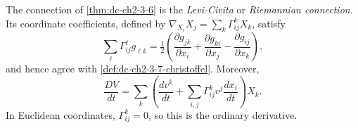 \begin{remark}
  \label{rem:dc-ch2-3-7}
  The connection of \cref{thm:dc-ch2-3-6} is the \emph{Levi-Civita} or
  \emph{Riemannian connection}. Its coordinate coefficients, defined by
  $\nabla_{X_i}X_j=\sum_k\Gamma_{ij}^kX_k$, satisfy
  \[
    \sum_\ell\Gamma_{ij}^\ell g_{\ell k}
      =\tfrac12\left(
        \frac{\partial g_{jk}}{\partial x_i}
       +\frac{\partial g_{ki}}{\partial x_j}
       -\frac{\partial g_{ij}}{\partial x_k}\right),
  \]
  and hence agree with \cref{def:dc-ch2-3-7-christoffel}. Moreover,
  \[
    \frac{DV}{dt}
      =\sum_k\left(\frac{dv^k}{dt}
        +\sum_{i,j}\Gamma_{ij}^kv^j\frac{dx_i}{dt}\right)X_k.
  \]
  In Euclidean coordinates, $\Gamma_{ij}^k=0$, so this is the ordinary
  derivative.
\end{remark}
